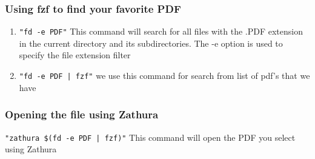 \documentclass[titlepage]{article}
\begin{document}
\subsubsection{Using fzf to find your favorite PDF}

\begin{enumerate}
    \item \texttt{"fd -e PDF"}
This command will search for all files with the .PDF extension in the current directory and its subdirectories. The -e option is used to specify the file extension filter
    \item \texttt{"fd -e PDF | fzf"} we use this command for search from list of pdf's that we have
\end{enumerate}

\subsubsection{Opening the file using Zathura}
\texttt{"zathura \$(fd -e PDF | fzf)"} This command will open the PDF you select using Zathura
\end{document}

